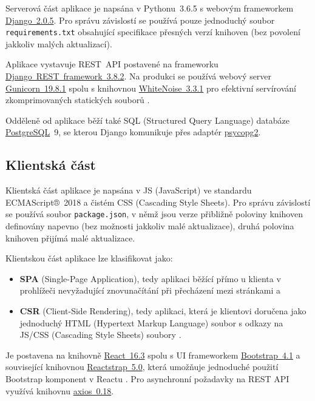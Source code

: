 Serverová část aplikace \cite{bp} je napsána v Pythonu~3.6.5 s webovým frameworkem \href{https://www.djangoproject.com/}{Django~2.0.5}. Pro správu závislostí se používá pouze jednoduchý soubor \verb|requirements.txt| obsahující specifikace přesných verzí knihoven (bez povolení jakkoliv malých aktualizací). 

Aplikace vystavuje REST~API postavené na frameworku \href{https://www.django-rest-framework.org/}{Django~REST~framework~3.8.2}. Na produkci se používá webový server \href{http://gunicorn.org/}{Gunicorn~19.8.1} spolu s knihovnou \href{http://whitenoise.evans.io/en/stable/}{WhiteNoise~3.3.1} pro efektivní servírování zkomprimovaných statických souborů \cite{whitenoise}.

Odděleně od aplikace běží také SQL (Structured Query Language) databáze \href{https://www.postgresql.org/}{PostgreSQL}~9, se kterou Django komunikuje přes adaptér \href{https://www.psycopg.org/}{psycopg2}.

\subsection{Klientská část}\label{subsec:bp-klientskacast}

Klientská část aplikace \cite{bp} je napsána v JS (JavaScript) ve standardu ECMAScript®~2018 a čistém CSS (Cascading Style Sheets). Pro správu závislostí se používá soubor \verb|package.json|, v němž jsou verze přibližně poloviny knihoven definovány napevno (bez možnosti jakkoliv malé aktualizace), druhá polovina knihoven přijímá malé aktualizace. 

Klientskou část aplikace lze klasifikovat jako: 
\begin{itemize}
    \item \textbf{SPA} (Single-Page Application), tedy aplikaci běžící přímo u klienta v prohlížeči nevyžadující znovunačítání při přecházení mezi stránkami \cite{spa1} a
    \item \textbf{CSR} (Client-Side Rendering), tedy aplikaci, která je klientovi doručena jako jednoduchý HTML (Hypertext Markup Language) soubor s odkazy na JS/CSS (Cascading Style Sheets) soubory \cite{csr-ssr}.
\end{itemize}

Je postavena na knihovně \href{https://reactjs.org/}{React~16.3} spolu s UI frameworkem \href{https://getbootstrap.com}{Bootstrap~4.1} a související knihovnou \href{https://reactstrap.github.io/}{Reactstrap~5.0}, která umožňuje jednoduché použití Bootstrap komponent v Reactu \cite{reactstrap}. Pro asynchronní požadavky na REST API využívá knihovnu \href{https://github.com/axios/axios}{axios~0.18}. 

